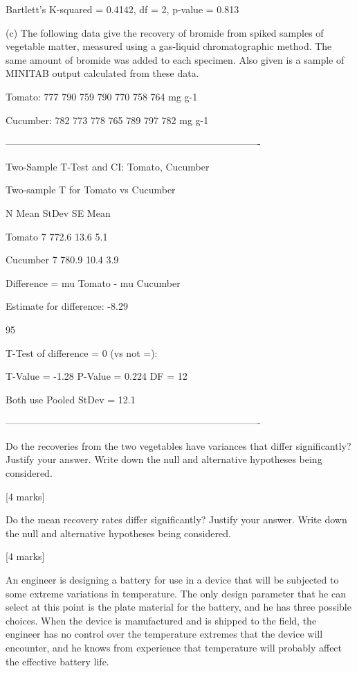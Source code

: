 Bartlett's K-squared = 0.4142, df = 2, p-value = 0.813


(c) The following data give the recovery of bromide from spiked samples of vegetable matter, measured using a gas-liquid chromatographic method. The same amount of bromide was added to each specimen. Also given is a sample of MINITAB output calculated from these data.


Tomato: 777 790 759 790 770 758 764 mg g-1

Cucumber: 782 773 778 765 789 797 782 mg g-1



-------------------------------------------------------------------------------


Two-Sample T-Test and CI: Tomato, Cucumber

Two-sample T for Tomato vs Cucumber

N Mean StDev SE Mean

Tomato 7 772.6 13.6 5.1

Cucumber 7 780.9 10.4 3.9

Difference = mu Tomato - mu Cucumber

Estimate for difference: -8.29

95%

T-Test of difference = 0 (vs not =):

T-Value = -1.28 P-Value = 0.224 DF = 12

Both use Pooled StDev = 12.1

-------------------------------------------------------------------------------

Do the recoveries from the two vegetables have variances that differ significantly? Justify your answer. Write down the null and alternative hypotheses being considered.

[4 marks]

Do the mean recovery rates differ significantly? Justify your answer. Write down the null and alternative hypotheses being considered.

[4 marks]






An engineer is designing a battery for use in a device that will be subjected to some extreme variations in temperature. 
The only design parameter that he can select at this point is the plate material for the battery, and he has three possible choices. 
When the device is manufactured and is shipped to the field, the engineer has no control over the temperature extremes that the device will encounter, and he knows from experience 
that temperature will probably affect the effective battery life. 

